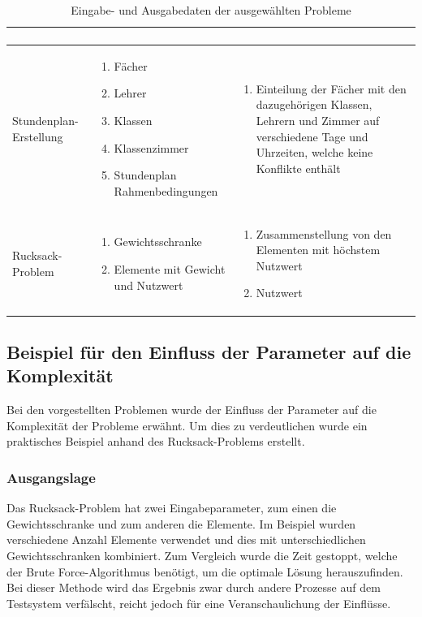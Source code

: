 \begin{table}[ht]
\begin{tabular}{ p{3cm} | p{5.4cm} | p{5.4cm} }
\begin{enumerate}
							   \end{enumerate}	\\ \hline
	Stundenplan-Erstellung			& \begin{enumerate}
								\item Fächer
								\item Lehrer
								\item Klassen
								\item Klassenzimmer
								\item Stundenplan Rahmenbedingungen
							   \end{enumerate}				
							&  \begin{enumerate}
								\item  Einteilung der Fächer mit den dazugehörigen Klassen, Lehrern und Zimmer auf verschiedene Tage und Uhrzeiten, welche keine 
									Konflikte enthält
							   \end{enumerate}	\\ \hline
	Rucksack-Problem				& \begin{enumerate}
								\item Gewichtsschranke
								\item Elemente mit Gewicht und Nutzwert
							   \end{enumerate}				
							&  \begin{enumerate}
								\item Zusammenstellung von den Elementen mit höchstem Nutzwert
								\item Nutzwert
							   \end{enumerate}	\\ \hline
  \end{tabular}
   \caption{Eingabe- und Ausgabedaten der ausgewählten Probleme}\label{table:input_output}
\end{table}

\newpage
\subsection{Beispiel für den Einfluss der Parameter auf die Komplexität \resultAssignment{[R1a]}}\label{example_complexity_knapsack}
Bei den vorgestellten Problemen wurde der Einfluss der Parameter auf die Komplexität der Probleme erwähnt. Um dies zu verdeutlichen wurde ein praktisches Beispiel anhand des 
Rucksack-Problems erstellt.

\subsubsection{Ausgangslage}
Das Rucksack-Problem hat zwei Eingabeparameter, zum einen die Gewichtsschranke und zum anderen die Elemente. Im Beispiel wurden verschiedene Anzahl Elemente verwendet und dies mit 
unterschiedlichen Gewichtsschranken kombiniert. Zum Vergleich wurde die Zeit gestoppt, welche der Brute Force-Algorithmus benötigt, um die optimale Lösung herauszufinden. Bei dieser 
Methode wird das Ergebnis zwar durch andere Prozesse auf dem Testsystem verfälscht, reicht jedoch für eine Veranschaulichung der Einflüsse.

